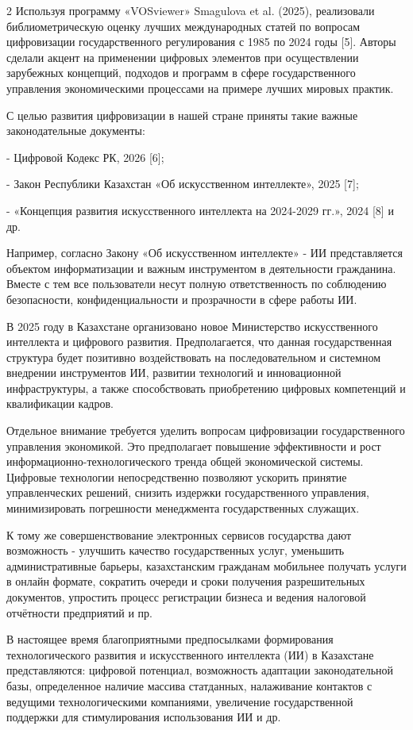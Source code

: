 \begin{multicols}{2}
Используя программу «VOSviewer» Smagulova et al. (2025), реализовали
библиометрическую оценку лучших международных статей по вопросам
цифровизации государственного регулирования с 1985 по 2024 годы {[}5{]}.
Авторы сделали акцент на применении цифровых элементов при осуществлении
зарубежных концепций, подходов и программ в сфере государственного
управления экономическими процессами на примере лучших мировых практик.

С целью развития цифровизации в нашей стране приняты такие важные
законодательные документы:

- Цифровой Кодекс РК, 2026 {[}6{]};

- Закон Республики Казахстан «Об искусственном интеллекте», 2025
{[}7{]};

- «Концепция развития искусственного интеллекта на 2024-2029 гг.», 2024
{[}8{]} и др.

Например, согласно Закону «Об искусственном интеллекте» - ИИ
представляется объектом информатизации и важным инструментом в
деятельности гражданина. Вместе с тем все пользователи несут полную
ответственность по соблюдению безопасности, конфиденциальности и
прозрачности в сфере работы ИИ.

В 2025 году в Казахстане организовано новое Министерство искусственного
интеллекта и цифрового развития. Предполагается, что данная
государственная структура будет позитивно воздействовать на
последовательном и системном внедрении инструментов ИИ, развитии
технологий и инновационной инфраструктуры, а также способствовать
приобретению цифровых компетенций и квалификации кадров.

Отдельное внимание требуется уделить вопросам цифровизации
государственного управления экономикой. Это предполагает повышение
эффективности и рост информационно-технологического тренда общей
экономической системы. Цифровые технологии непосредственно позволяют
ускорить принятие управленческих решений, снизить издержки
государственного управления, минимизировать погрешности менеджмента
государственных служащих.

К тому же совершенствование электронных сервисов государства дают
возможность - улучшить качество государственных услуг, уменьшить
административные барьеры, казахстанским гражданам мобильнее получать
услуги в онлайн формате, сократить очереди и сроки получения
разрешительных документов, упростить процесс регистрации бизнеса и
ведения налоговой отчётности предприятий и пр.

В настоящее время благоприятными предпосылками формирования
технологического развития и искусственного интеллекта (ИИ) в Казахстане
представляются: цифровой потенциал, возможность адаптации
законодательной базы, определенное наличие массива статданных,
налаживание контактов с ведущими технологическими компаниями, увеличение
государственной поддержки для стимулирования использования ИИ и др.


\end{multicols}
